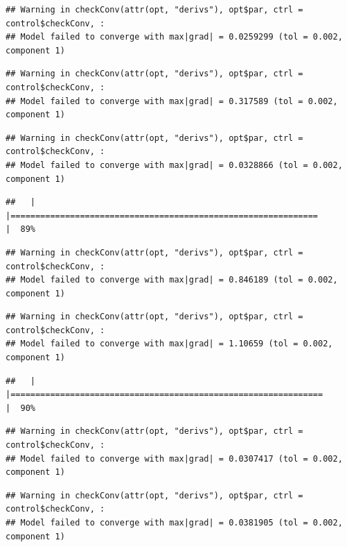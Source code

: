 \documentclass[
  12pt,
]{book}
\begin{document}
\begin{verbatim}
## Warning in checkConv(attr(opt, "derivs"), opt$par, ctrl = control$checkConv, :
## Model failed to converge with max|grad| = 0.0259299 (tol = 0.002, component 1)
\end{verbatim}

\begin{verbatim}
## Warning in checkConv(attr(opt, "derivs"), opt$par, ctrl = control$checkConv, :
## Model failed to converge with max|grad| = 0.317589 (tol = 0.002, component 1)
\end{verbatim}

\begin{verbatim}
## Warning in checkConv(attr(opt, "derivs"), opt$par, ctrl = control$checkConv, :
## Model failed to converge with max|grad| = 0.0328866 (tol = 0.002, component 1)
\end{verbatim}

\begin{verbatim}
##   |                                                                              |==============================================================        |  89%
\end{verbatim}

\begin{verbatim}
## Warning in checkConv(attr(opt, "derivs"), opt$par, ctrl = control$checkConv, :
## Model failed to converge with max|grad| = 0.846189 (tol = 0.002, component 1)
\end{verbatim}

\begin{verbatim}
## Warning in checkConv(attr(opt, "derivs"), opt$par, ctrl = control$checkConv, :
## Model failed to converge with max|grad| = 1.10659 (tol = 0.002, component 1)
\end{verbatim}

\begin{verbatim}
##   |                                                                              |===============================================================       |  90%
\end{verbatim}

\begin{verbatim}
## Warning in checkConv(attr(opt, "derivs"), opt$par, ctrl = control$checkConv, :
## Model failed to converge with max|grad| = 0.0307417 (tol = 0.002, component 1)
\end{verbatim}

\begin{verbatim}
## Warning in checkConv(attr(opt, "derivs"), opt$par, ctrl = control$checkConv, :
## Model failed to converge with max|grad| = 0.0381905 (tol = 0.002, component 1)
\end{verbatim}
\end{document}
